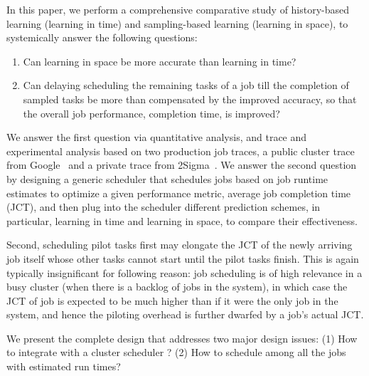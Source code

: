 In this paper, we perform a comprehensive comparative study
of history-based learning (learning in time) and sampling-based learning
(learning in space), to systemically answer the following questions:
\begin{enumerate}
\item Can learning in space be more accurate than learning in time?
\item Can {delaying scheduling} the remaining tasks of a job till the completion
of sampled tasks be more than compensated by the improved accuracy, so
that the overall job performance, \eg completion time, is improved?
\end{enumerate}

We answer the first question via quantitative analysis, and trace and
experimental analysis based on two production job traces, a public
cluster trace from Google~\cite{googleTraceGithub} and a private trace
from 2Sigma~\cite{2Sigma:website}.  We answer the second
question by designing a generic scheduler that schedules jobs based on
job runtime estimates to optimize a given performance metric, \eg
average job completion time (JCT), and then plug into the scheduler
different prediction schemes, in particular, learning in time and
learning in space, to compare their effectiveness.

  Second, scheduling pilot tasks first may elongate the JCT of the newly
arriving job itself whose other tasks cannot start until the pilot
tasks finish. This is again typically insignificant for following reason:
job scheduling is of high relevance in a busy
cluster (when there is a backlog of jobs in the system), in which
case the JCT of job is expected to be much higher than if it were
the only job in the system, and hence the piloting overhead is
further dwarfed by a job's actual JCT.

We present the complete \name design that addresses two major design issues:
(1) How to integrate \namepredict with a cluster scheduler \gs?
(2) How to schedule among all the jobs with estimated run times?


